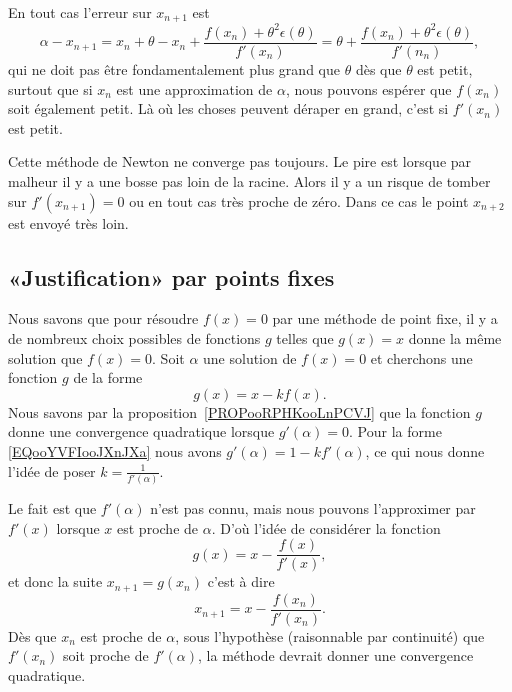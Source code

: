     En tout cas l'erreur sur \( x_{n+1}\) est
    \begin{equation}
        \alpha-x_{n+1}=x_n+\theta-x_n+\frac{ f(x_n)+\theta^2\epsilon(\theta) }{ f'(x_n) }=\theta+\frac{ f(x_n)+\theta^2\epsilon(\theta) }{ f'(n_n) },
    \end{equation}
    qui ne doit pas être fondamentalement plus grand que \( \theta\) dès que \( \theta\) est petit, surtout que si \( x_n\) est une approximation de \( \alpha\), nous pouvons espérer que \( f(x_n)\) soit également petit. Là où les choses peuvent déraper en grand, c'est si \( f'(x_n)\) est petit.

Cette méthode de Newton ne converge pas toujours. Le pire est lorsque par malheur il y a une bosse pas loin de la racine. Alors il y a un risque de tomber sur \( f'(x_{n+1})=0\) ou en tout cas très proche de zéro. Dans ce cas le point \( x_{n+2}\) est envoyé très loin.

\subsection{«Justification» par points fixes}
\label{SUBSECooIBLNooTujslO}

Nous savons que pour résoudre \( f(x)=0\) par une méthode de point fixe, il y a de nombreux choix possibles de fonctions \( g\) telles que \( g(x)=x\) donne la même solution que \( f(x)=0\). Soit \( \alpha\) une solution de \( f(x)=0\) et cherchons une fonction \( g\) de la forme
\begin{equation}        \label{EQooYVFIooJXnJXa}
    g(x)=x-kf(x).
\end{equation}
Nous savons par la proposition~\ref{PROPooRPHKooLnPCVJ} que la fonction \( g\) donne une convergence quadratique lorsque \( g'(\alpha)=0\). Pour la forme \eqref{EQooYVFIooJXnJXa} nous avons \( g'(\alpha)=1-kf'(\alpha)\), ce qui nous donne l'idée de poser \( k=\frac{1}{ f'(\alpha) }\).

Le fait est que \( f'(\alpha)\) n'est pas connu, mais nous pouvons l'approximer par \( f'(x)\) lorsque \( x\) est proche de \( \alpha\). D'où l'idée de considérer la fonction
\begin{equation}
    g(x)=x-\frac{ f(x) }{ f'(x) },
\end{equation}
et donc la suite \( x_{n+1}=g(x_n)\) c'est à dire
\begin{equation}
    x_{n+1}=x-\frac{ f(x_n) }{ f'(x_n) }.
\end{equation}
Dès que \( x_n\) est proche de \( \alpha\), sous l'hypothèse (raisonnable par continuité) que \( f'(x_n)\) soit proche de \( f'(\alpha)\), la méthode devrait donner une convergence quadratique.

